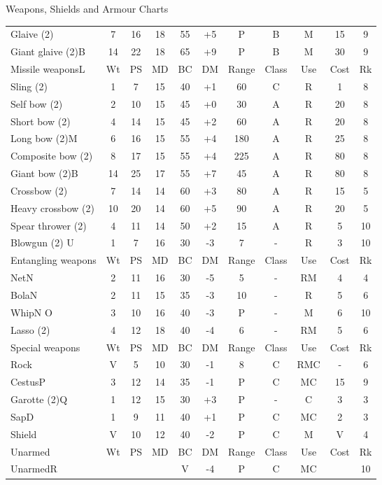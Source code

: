 \begin{Table}{Weapons, Shields and Armour Charts}
\begin{tabularx}{\linewidth}{Xcccccccccc}
Glaive (2)		& 7	& 16	& 18	& 55	& +5	& P	& B	& M	& 15	& 9	\\
Giant glaive (2)B	& 14	& 22	& 18	& 65	& +9	& P	& B	& M	& 30	& 9	\\
Missile weaponsL	& Wt	& PS	& MD	& BC	& DM	& Range	& Class	& Use	& Cost	& Rk	\\
Sling (2)		& 1	& 7	& 15	& 40	& +1	& 60	& C	& R	& 1	& 8	\\
Self bow (2)		& 2	& 10	& 15	& 45	& +0	& 30	& A	& R	& 20	& 8	\\
Short bow (2)		& 4	& 14	& 15	& 45	& +2	& 60	& A	& R	& 20	& 8	\\
Long bow (2)M		& 6	& 16	& 15	& 55	& +4	& 180	& A	& R	& 25	& 8	\\
Composite bow (2)	& 8	& 17	& 15	& 55	& +4	& 225	& A	& R	& 80	& 8	\\
Giant bow (2)B		& 14	& 25	& 17	& 55	& +7	& 45	& A	& R	& 80	& 8	\\
Crossbow (2)		& 7	& 14	& 14	& 60	& +3	& 80	& A	& R	& 15	& 5	\\
Heavy crossbow (2)	& 10	& 20	& 14	& 60	& +5	& 90	& A	& R	& 20	& 5	\\
Spear thrower (2)	& 4	& 11	& 14	& 50	& +2	& 15	& A	& R	& 5	& 10	\\
Blowgun (2) U		& 1	& 7	& 16	& 30	& -3	& 7	& -	& R	& 3	& 10	\\
Entangling weapons	& Wt	& PS	& MD	& BC	& DM	& Range	& Class	& Use	& Cost	& Rk	\\
NetN			& 2	& 11	& 16	& 30	& -5	& 5	& -	& RM	& 4	& 4	\\ 
BolaN			& 2	& 11	& 15	& 35	& -3	& 10	& -	& R	& 5	& 6	\\
WhipN O			& 3	& 10	& 16	& 40	& -3	& P	& -	& M	& 6	& 10	\\
Lasso (2)		& 4	& 12	& 18	& 40	& -4	& 6	& -	& RM	& 5	& 6	\\
Special weapons		& Wt	& PS	& MD	& BC	& DM	& Range	& Class	& Use	& Cost	& Rk	\\
Rock			& V	& 5	& 10	& 30	& -1	& 8	& C	& RMC	& -	& 6	\\
CestusP			& 3	& 12	& 14	& 35	& -1	& P	& C	& MC	& 15	& 9	\\
Garotte (2)Q		& 1	& 12	& 15	& 30	& +3	& P	& -	& C	& 3	& 3	\\
SapD			& 1	& 9	& 11	& 40	& +1	& P	& C	& MC	& 2	& 3	\\
Shield			& V	& 10	& 12	& 40	& -2	& P	& C	& M	& V	& 4	\\
Unarmed			& Wt	& PS	& MD	& BC	& DM	& Range	& Class	& Use	& Cost	& Rk	\\
UnarmedR		&	& 	& 	& V	& -4	& P	& C	& MC	& 	& 10	\\
\end{tabularx}



\end{Table}

